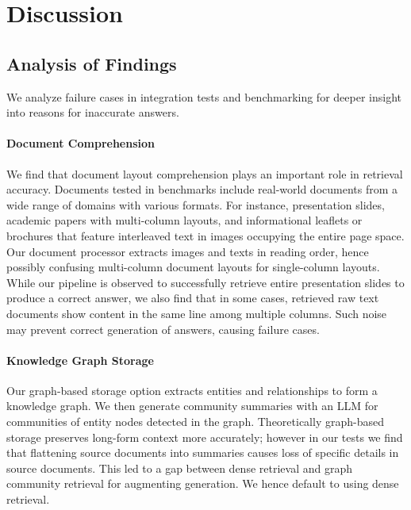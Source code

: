 \section{Discussion}

\subsection{Analysis of Findings}

We analyze failure cases in integration tests and benchmarking for deeper insight into reasons for inaccurate answers.

\paragraph{Document Comprehension}
We find that document layout comprehension plays an important role in retrieval accuracy.
Documents tested in benchmarks include real-world documents from a wide range of domains with various formats.
For instance, presentation slides, academic papers with multi-column layouts, and informational leaflets or brochures
that feature interleaved text in images occupying the entire page space.
Our document processor extracts images and texts in reading order, hence possibly confusing multi-column document layouts for single-column layouts.
While our pipeline is observed to successfully retrieve entire presentation slides to produce a correct answer,
we also find that in some cases, retrieved raw text documents show content in the same line among multiple columns.
Such noise may prevent correct generation of answers, causing failure cases.

\paragraph{Knowledge Graph Storage}
Our graph-based storage option extracts entities and relationships to form a knowledge graph.
We then generate community summaries with an LLM for communities of entity nodes detected in the graph.
Theoretically graph-based storage preserves long-form context more accurately;
however in our tests we find that flattening source documents into summaries causes loss of specific details in source documents.
This led to a gap between dense retrieval and graph community retrieval for augmenting generation.
We hence default to using dense retrieval.

